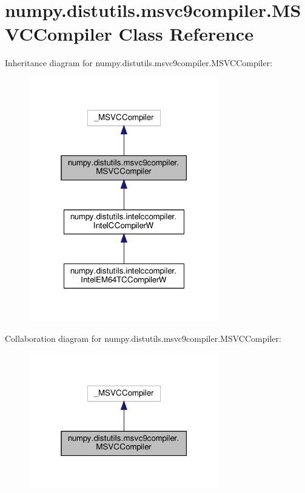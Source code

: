 \hypertarget{classnumpy_1_1distutils_1_1msvc9compiler_1_1MSVCCompiler}{}\section{numpy.\+distutils.\+msvc9compiler.\+M\+S\+V\+C\+Compiler Class Reference}
\label{classnumpy_1_1distutils_1_1msvc9compiler_1_1MSVCCompiler}


Inheritance diagram for numpy.\+distutils.\+msvc9compiler.\+M\+S\+V\+C\+Compiler\+:
\nopagebreak
\begin{figure}[H]
\begin{center}
\leavevmode
\includegraphics[width=235pt]{classnumpy_1_1distutils_1_1msvc9compiler_1_1MSVCCompiler__inherit__graph}
\end{center}
\end{figure}


Collaboration diagram for numpy.\+distutils.\+msvc9compiler.\+M\+S\+V\+C\+Compiler\+:
\nopagebreak
\begin{figure}[H]
\begin{center}
\leavevmode
\includegraphics[width=235pt]{classnumpy_1_1distutils_1_1msvc9compiler_1_1MSVCCompiler__coll__graph}
\end{center}
\end{figure}
